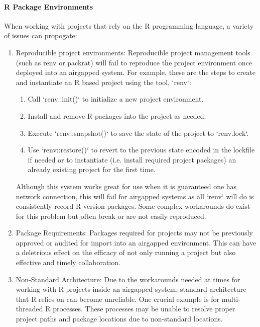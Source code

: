 \documentclass{amia}
\begin{document}
\paragraph{R Package Environments}

When working with projects that rely on the R programming language, a variety of issues can propogate:

\begin{enumerate}
	\item Reproducible project environments: Reproducible project management tools (such as renv or packrat) will fail to reproduce the project environment once deployed into an airgapped system. For example, these are the steps to create and instantiate an R based project using the tool, `renv`:
		\begin{enumerate}
			\item Call `renv::init()` to initialize a new project environment.

			\item Install and remove R packages into the project as needed.

			\item Execute `renv::snapshot()` to save the state of the project to `renv.lock`.

			\item Use `renv::restore()` to revert to the previous state encoded in the lockfile if needed or to instantiate (i.e. install required project packages) an already existing project for the first time.
		\end{enumerate}
	Although this system works great for use when it is guaranteed one has network connection, this will fail for airgapped systems as all `renv` will do is consistently record R version packages. Some complex workarounds do exist for this problem but often break or are not easily reproduced. 
	\item Package Requirements: Packages required for projects may not be previously approved or audited for import into an airgapped environment. This can have a deletrious effect on the efficacy of not only running a project but also effective and timely collaboration. 
	\item Non-Standard Architecture: Due to the workarounds needed at times for working with R projects inside an airgapped system, standard architecture that R relies on can become unreliable. One crucial example is for multi-threaded R processes. These processes may be unable to resolve proper project paths and package locations due to non-standard locations.
\end{enumerate}
\end{document}
